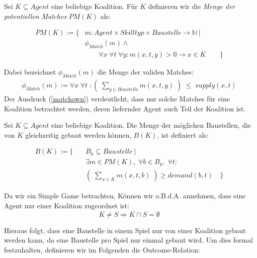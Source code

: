 \begin{definition}
  Sei $K\subseteq Agent$ eine beliebige Koalition. Für $K$ definieren wir die \textit{Menge der potentiellen Matches} $PM(K)$ als:

  \begin{eqnarray}
    PM(K) := \{ & m: Agent \times Skilltyp \times Baustelle \rightarrow \mathbb{N}\ |\\
    & \phi_{Match}(m) \land \\
    & \quad \quad \forall x\;\forall t\;\forall y: m(x,t, y) > 0 \rightarrow x\in K \quad \quad\} \label{matchown}
  \end{eqnarray}

  Dabei bezeichnet $\phi_{Match}(m)$ die Menge der validen Matches:
  \begin{eqnarray}
    \phi_{Match}(m) := \forall x\; \forall t\; : \left(\;\sum_{y\in Baustelle} m(x,t,y)\;\right)\;\leq \;supply(x,t)
  \end{eqnarray}
  Der Ausdruck (\ref{matchown}) verdeutlicht, dass nur solche Matches für eine Koalition betrachtet werden, deren liefernder Agent auch Teil der Koalition ist.
\end{definition}

\begin{definition}
  Sei $K\subseteq Agent$ eine beliebige Koalition. Die Menge der möglichen Baustellen, die von $K$ gleichzeitig gebaut werden können, $B(K)$, ist definiert als:

  \begin{align}
     B(K) := \{\quad &B_k \subseteq Baustelle\ | \\
     &\exists m\in PM(K), \;\forall b\in B_k, \;\forall t: \\
     &\left(\; \sum_{x\in K}m(x,t,b) \;\right)\geq demand(b, t) \quad\}
  \end{align}

\end{definition}

\noindent
Da wir ein Simple Game betrachten, Können wir o.B.d.A. annehmen, dass eine Agent nur einer Koalition zugeordnet ist:
\begin{equation}
  K\neq S \Rightarrow K\cap S =\emptyset \label{koalitiondisjunct}
\end{equation}

\noindent
Hieraus folgt, dass eine Baustelle in einem Spiel nur von einer Koalition gebaut werden kann, da eine Baustelle pro Spiel nur einmal gebaut wird. Um dies formal festzuhalten, definieren wir im Folgenden die Outcome-Relation:

